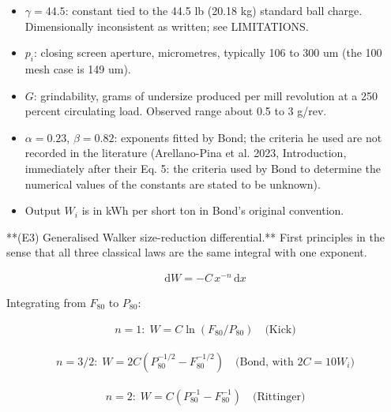 \documentclass[10pt,a4paper,twoside]{report}
\begin{document}
\begin{itemize}
\item $\gamma = 44.5$: constant tied to the 44.5 lb (20.18 kg) standard ball charge. Dimensionally inconsistent as written; see LIMITATIONS.
\item $p_i$: closing screen aperture, micrometres, typically 106 to 300 um (the 100 mesh case is 149 um).
\item $G$: grindability, grams of undersize produced per mill revolution at a 250 percent circulating load. Observed range about 0.5 to 3 g/rev.
\item $\alpha = 0.23$, $\beta = 0.82$: exponents fitted by Bond; the criteria he used are not recorded in the literature (Arellano-Pina et al. 2023, Introduction, immediately after their Eq. 5: the criteria used by Bond to determine the numerical values of the constants are stated to be unknown).
\item Output $W_i$ is in kWh per short ton in Bond's original convention.
\end{itemize}

**(E3) Generalised Walker size-reduction differential.** First principles in the sense that all three classical laws are the same integral with one exponent.

\begin{equation*}
\begin{gathered}
\mathrm{d}W = -C\, x^{-n}\, \mathrm{d}x
\end{gathered}
\end{equation*}

Integrating from $F_{80}$ to $P_{80}$:

\begin{equation*}
\begin{gathered}
n = 1:\; W = C \ln (F_{80}/P_{80}) \quad \text{(Kick)}
\end{gathered}
\end{equation*}

\begin{equation*}
\begin{gathered}
n = 3/2:\; W = 2C\left( P_{80}^{-1/2} - F_{80}^{-1/2} \right) \quad \text{(Bond, with } 2C = 10 W_i )
\end{gathered}
\end{equation*}

\begin{equation*}
\begin{gathered}
n = 2:\; W = C\left( P_{80}^{-1} - F_{80}^{-1} \right) \quad \text{(Rittinger)}
\end{gathered}
\end{equation*}
\end{document}
